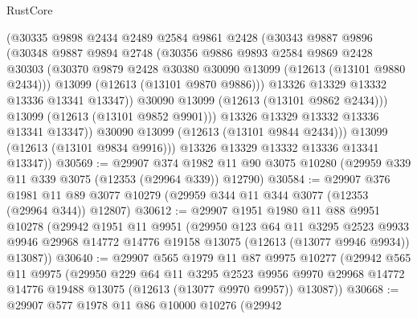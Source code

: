 \begin{lexlean}{RustCore}
\begin{coremodule}
                  (@30335
                    @9898
                    @2434
                    @2489
                    @2584
                    @9861
                    @2428
                    (@30343
                      @9887
                      @9896
                      (@30348
                        @9887
                        @9894
                        @2748
                        (@30356
                          @9886
                          @9893
                          @2584
                          @9869
                          @2428
                          @30303
                          (@30370 @9879 @2428 @30380 @30090 @13099 (@12613 (@13101 @9880 @2434)))
                          @13099
                          (@12613 (@13101 @9870 @9886)))
                        @13326
                        @13329
                        @13332
                        @13336
                        @13341
                        @13347))
                    @30090
                    @13099
                    (@12613 (@13101 @9862 @2434)))
                  @13099
                  (@12613 (@13101 @9852 @9901)))
                @13326
                @13329
                @13332
                @13336
                @13341
                @13347))
            @30090
            @13099
            (@12613 (@13101 @9844 @2434)))
          @13099
          (@12613 (@13101 @9834 @9916)))
        @13326
        @13329
        @13332
        @13336
        @13341
        @13347))
@30569 := @29907
    @374
    @1982
    @11
    @90
    @3075
    @10280
    (@29959 @339 @11 @339 @3075 (@12353 (@29964 @339)) @12790)
@30584 := @29907
    @376
    @1981
    @11
    @89
    @3077
    @10279
    (@29959 @344 @11 @344 @3077 (@12353 (@29964 @344)) @12807)
@30612 := @29907
    @1951
    @1980
    @11
    @88
    @9951
    @10278
    (@29942
      @1951
      @11
      @9951
      (@29950
        @123
        @64
        @11
        @3295
        @2523
        @9933
        @9946
        @29968
        @14772
        @14776
        @19158
        @13075
        (@12613 (@13077 @9946 @9934))
        @13087))
@30640 := @29907
    @565
    @1979
    @11
    @87
    @9975
    @10277
    (@29942
      @565
      @11
      @9975
      (@29950
        @229
        @64
        @11
        @3295
        @2523
        @9956
        @9970
        @29968
        @14772
        @14776
        @19488
        @13075
        (@12613 (@13077 @9970 @9957))
        @13087))
@30668 := @29907
    @577
    @1978
    @11
    @86
    @10000
    @10276
    (@29942

\end{coremodule}
\end{lexlean}
